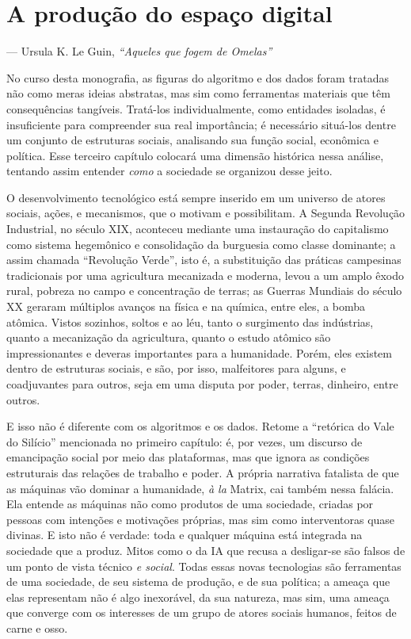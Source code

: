 \chapter{A produção do espaço digital}

\epigraph{
}{--- Ursula K. Le Guin, \textit{``Aqueles que fogem de Omelas''}}

No curso desta monografia, as figuras do algoritmo e dos dados foram tratadas não como meras ideias abstratas, mas sim como ferramentas materiais que têm consequências tangíveis.
Tratá-los individualmente, como entidades isoladas, é insuficiente para compreender sua real importância; é necessário situá-los dentre um conjunto de estruturas sociais, analisando sua função social, econômica e política.
Esse terceiro capítulo colocará uma dimensão histórica nessa análise, tentando assim entender \textit{como} a sociedade se organizou desse jeito.

O desenvolvimento tecnológico está sempre inserido em um universo de atores sociais, ações, e mecanismos, que o motivam e possibilitam.
A Segunda Revolução Industrial, no século XIX, aconteceu mediante uma instauração do capitalismo como sistema hegemônico e consolidação da burguesia como classe dominante; a assim chamada ``Revolução Verde'', isto é, a substituição das práticas campesinas tradicionais por uma agricultura mecanizada e moderna, levou a um amplo êxodo rural, pobreza no campo e concentração de terras; as Guerras Mundiais do século XX geraram múltiplos avanços na física e na química, entre eles, a bomba atômica.
Vistos sozinhos, soltos e ao léu, tanto o surgimento das indústrias, quanto a mecanização da agricultura, quanto o estudo atômico são impressionantes e deveras importantes para a humanidade.
Porém, eles existem dentro de estruturas sociais, e são, por isso, malfeitores para alguns, e coadjuvantes para outros, seja em uma disputa por poder, terras, dinheiro, entre outros.

E isso não é diferente com os algoritmos e os dados.
Retome a ``retórica do Vale do Silício'' mencionada no primeiro capítulo: é, por vezes, um discurso de emancipação social por meio das plataformas, mas que ignora as condições estruturais das relações de trabalho e poder.
A própria narrativa fatalista de que as máquinas vão dominar a humanidade, \textit{à la} Matrix, cai também nessa falácia.
Ela entende as máquinas não como produtos de uma sociedade, criadas por pessoas com intenções e motivações próprias, mas sim como interventoras quase divinas.
E isto não é verdade: toda e qualquer máquina está integrada na sociedade que a produz.
Mitos como o da IA que recusa a desligar-se são falsos de um ponto de vista técnico \textit{e social}.
Todas essas novas tecnologias são ferramentas de uma sociedade, de seu sistema de produção, e de sua política; a ameaça que elas representam não é algo inexorável, da sua natureza, mas sim, uma ameaça que converge com os interesses de um grupo de atores sociais humanos, feitos de carne e osso.

